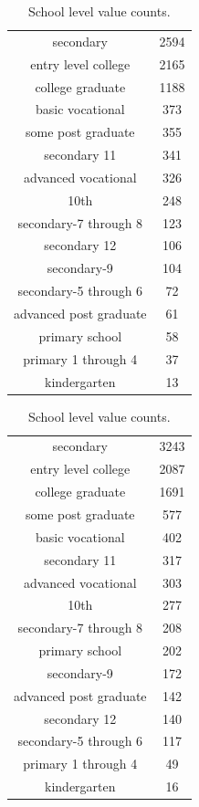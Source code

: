\begin{table}[!h]
    \caption{School level value counts.}
    \label{tab:}

    \begin{subtable}[ht]{.5\textwidth}
        \centering
        \begin{tabular}{cc}
            secondary & 2594 \\
            entry level college & 2165 \\
            college graduate & 1188 \\
            basic vocational & 373 \\
            some post graduate & 355 \\
            secondary 11 & 341 \\
            advanced vocational & 326 \\
            10th & 248 \\
            secondary-7 through 8 & 123 \\
            secondary 12 & 106 \\
            secondary-9 & 104 \\
            secondary-5 through 6 & 72 \\
            advanced post graduate & 61 \\
            primary school & 58 \\
            primary 1 through 4 & 37 \\
            kindergarten & 13 \\
        \end{tabular}
    \end{subtable}
    \begin{subtable}[ht]{.5\textwidth}
        \centering
        \begin{tabular}{cc}
            secondary & 3243 \\
            entry level college & 2087 \\
            college graduate & 1691 \\
            some post graduate & 577 \\
            basic vocational & 402 \\
            secondary 11 & 317 \\
            advanced vocational & 303 \\
            10th & 277 \\
            secondary-7 through 8 & 208 \\
            primary school & 202 \\
            secondary-9 & 172 \\
            advanced post graduate & 142 \\
            secondary 12 & 140 \\
            secondary-5 through 6 & 117 \\
            primary 1 through 4 & 49 \\
            kindergarten & 16 \\
        \end{tabular}
    \end{subtable}


\end{table}
